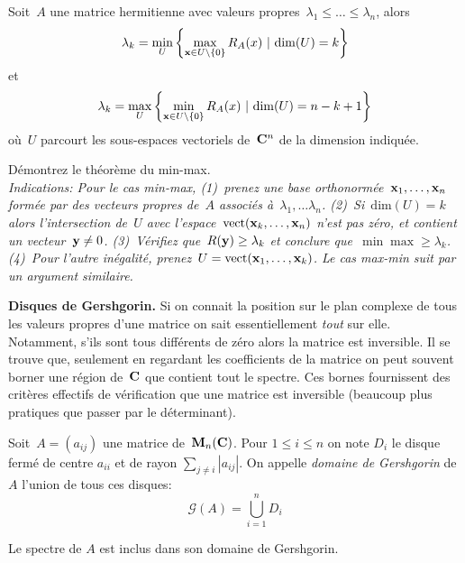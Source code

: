 \begin{proposition}
	Soit~$A$ une matrice hermitienne avec valeurs
	propres~$\lambda_1\le\ldots\le\lambda_n$, alors
	\[
		\lambda_k = \min_U\left\{ \max_{\mathbf{x}\in U\setminus\{0\}} R_A(x) \ |\ \mathrm{dim}(U)=k\right\}
	\]
	et
	\[
		\lambda_k = \max_U\left\{ \min_{\x\in
		U\setminus\{0\}}R_A(x) \ |\ \mathrm{dim}(U)=n-k+1\right\}
	\]
	où~$U$ parcourt les sous-espaces vectoriels de~$\mathbf{C}^n$ de la dimension
	indiquée.
\end{proposition}

\begin{exercice}
	Démontrez le théorème du min-max.\\
	\emph{
		Indications: Pour le cas min-max, (1)~prenez une base
		orthonormée~$\mathbf{x}_1,\ldots,\mathbf{x}_n$ formée par des vecteurs propres de~$A$
		associés à~$\lambda_1,\ldots\lambda_n$.  (2)~Si~$\mathrm{dim}(U)=k$ alors
		l'intersection de~$U$ avec l'espace~$\mathrm{vect}(\mathbf{x}_k,\ldots,\mathbf{x}_n)$
		n'est pas zéro, et contient un vecteur~$\mathbf{y}\neq0$. (3)~Vérifiez
		que~$R(\mathbf{y})\ge\lambda_k$ et conclure que~$\min\max\ge\lambda_k$. (4)~Pour
		l'autre inégalité, prenez~$U=\mathrm{vect}(\mathbf{x}_1,\ldots,\mathbf{x}_k)$.  Le cas
		max-min suit par un argument similaire.
}
\end{exercice}



{\bf Disques de Gershgorin.}
Si on connait la position sur le plan complexe
de tous les valeurs propres d'une matrice on sait essentiellement \emph{tout}
sur elle.  Notamment, s'ils sont tous différents de zéro alors la matrice est
inversible.  Il se trouve que, seulement en regardant les coefficients de la
matrice on peut souvent borner une région de~$\mathbf{C}$ que contient tout le
spectre.  Ces bornes fournissent des critères effectifs de vérification que
une matrice est inversible (beaucoup plus pratiques que passer par le
déterminant).

\begin{definition}
	Soit~$A=(a_{ij})$ une matrice de~$\mathbf{M}_n(\mathbf{C})$.
Pour $1\leq i\leq n$ on note $D_i$ le disque fermé de centre $a_{ii}$ et de
rayon $\sum_{j\neq i} |a_{ij}|$. On appelle \emph{domaine de Gershgorin} de
$A$ l'union de tous ces disques:
\begin{displaymath}
\mathcal G(A) = \bigcup_{i=1}^n D_i
\end{displaymath}
\end{definition}
\begin{proposition}
	\label{prop:gersh}
	Le spectre de $A$ est inclus dans son domaine de Gershgorin.
\end{proposition}

